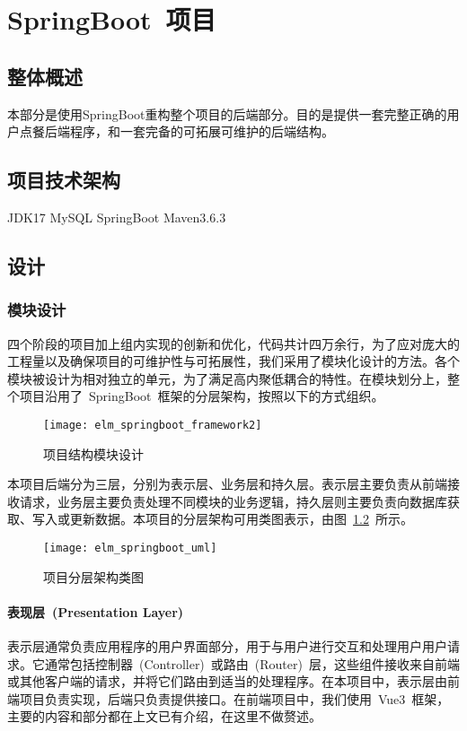 \chapter{SpringBoot~项目}
\section{整体概述}
本部分是使用SpringBoot重构整个项目的后端部分。目的是提供一套完整正确的用户点餐后端程序，和一套完备的可拓展可维护的后端结构。

\section{项目技术架构}
JDK17 MySQL SpringBoot Maven3.6.3

\section{设计}

\subsection{模块设计}
四个阶段的项目加上组内实现的创新和优化，代码共计四万余行，为了应对庞大的工程量以及确保项目的可维护性与可拓展性，我们采用了模块化设计的方法。各个模块被设计为相对独立的单元，为了满足高内聚低耦合的特性。在模块划分上，整个项目沿用了~SpringBoot~框架的分层架构，按照以下的方式组织。
\begin{figure}[htbp]
    \centering
    \texttt{[image: elm\_springboot\_framework2]}
    \caption{项目结构模块设计}\label{fig:elm_springboot_framework}
    \vspace{\baselineskip}
\end{figure}

本项目后端分为三层，分别为表示层、业务层和持久层。表示层主要负责从前端接收请求，业务层主要负责处理不同模块的业务逻辑，持久层则主要负责向数据库获取、写入或更新数据。本项目的分层架构可用类图表示，由图~\ref{fig:elm_springboot_uml}~所示。
\begin{figure}[htbp]
    \centering
    \texttt{[image: elm\_springboot\_uml]}
    \caption{项目分层架构类图}\label{fig:elm_springboot_uml}
    \vspace{\baselineskip}
\end{figure}

\subsubsection{表现层~(Presentation Layer)~}
表示层通常负责应用程序的用户界面部分，用于与用户进行交互和处理用户用户请求。它通常包括控制器~(Controller)~或路由~(Router)~层，这些组件接收来自前端或其他客户端的请求，并将它们路由到适当的处理程序。在本项目中，表示层由前端项目负责实现，后端只负责提供接口。在前端项目中，我们使用~Vue3~框架，主要的内容和部分都在上文已有介绍，在这里不做赘述。

